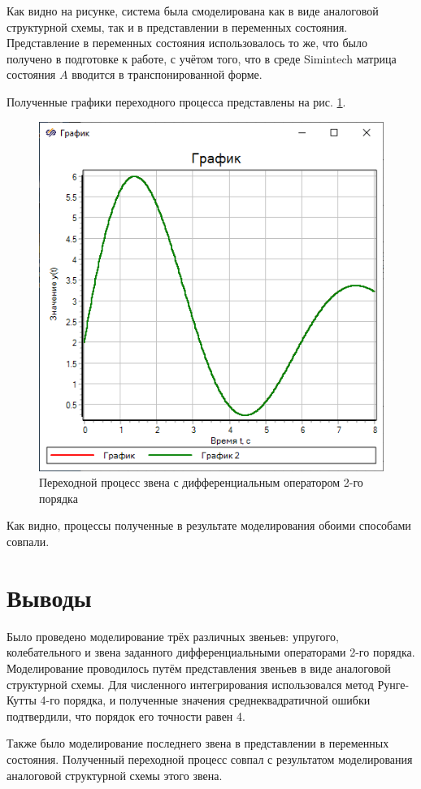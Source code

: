 	Как видно на рисунке, система была смоделирована как в виде аналоговой структурной схемы, так и в представлении в переменных состояния. Представление в переменных состояния использовалось то же, что было получено в подготовке к работе, с учётом того, что в среде Simintech матрица состояния $A$ вводится в транспонированной форме.
	
	Полученные графики переходного процесса представлены на рис. \ref{graph5}.
	\begin{figure}[h]
		\centering\includegraphics[width=.55\textwidth]{png/graph5.png}
		\caption{Переходной процесс звена с дифференциальным оператором 2-го порядка}
		\label{graph5}
	\end{figure}

	Как видно, процессы полученные в результате моделирования обоими способами совпали.
	
	\section{Выводы}
	
	Было проведено моделирование трёх различных звеньев: упругого, колебательного и звена заданного дифференциальными операторами 2-го порядка. Моделирование проводилось путём представления звеньев в виде аналоговой структурной схемы. Для численного интегрирования использовался метод Рунге-Кутты 4-го порядка, и полученные значения среднеквадратичной ошибки подтвердили, что порядок его точности равен 4.
	
	Также было моделирование последнего звена в представлении в переменных состояния. Полученный переходной процесс совпал с результатом моделирования аналоговой структурной схемы этого звена.
	

